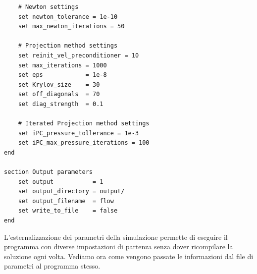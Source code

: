 \begin{verbatim}
    # Newton settings
    set newton_tolerance = 1e-10
    set max_newton_iterations = 50

    # Projection method settings
    set reinit_vel_preconditioner = 10
    set max_iterations = 1000
    set eps            = 1e-8
    set Krylov_size    = 30
    set off_diagonals  = 70
    set diag_strength  = 0.1

    # Iterated Projection method settings
    set iPC_pressure_tollerance = 1e-3
    set iPC_max_pressure_iterations = 100
end

section Output parameters
    set output           = 1
    set output_directory = output/
    set output_filename  = flow
    set write_to_file    = false
end
        \end{verbatim}
        L'esternalizzazione dei parametri della simulazione permette di eseguire il programma con diverse impostazioni di partenza senza dover ricompilare la soluzione ogni volta. Vediamo ora come
        vengono passate le informazioni dal file di parametri al programma stesso.

